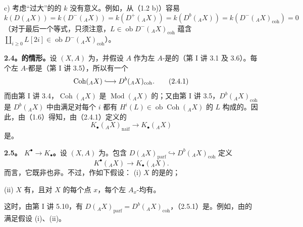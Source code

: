 c) 考虑“过大”的的 $k$ 没有意义。例如，从（1.2 b)）容易
\[k(D({}_AX))=k(D^-({}_AX))=k(D^+({}_AX))=k(D^b({}_AX))=k(D^-({}_AX)_{\mathrm{coh}})=0\]
（对于最后一个等式，只须注意，$L\in\operatorname{ob}D^-({}_AX)_{\mathrm{coh}}$ 蕴含 $\coprod_{i\geq0}L[2i]\in\operatorname{ob}D^-({}_AX)_{\mathrm{coh}}$）。

\textbf{2.4。的情形。}设 $(X,A)$ 为，并假设 $A$ 作为左 $A$-是的（第 I 讲 3.1 及 3.6）。每个左 $A$-都是（第 I 讲 3.5），所以有一个
\[\operatorname{Coh}({}_AX)\lhook\joinrel\longrightarrow D^b({}_AX)_{\mathrm{coh}}.\tag{2.4.1}\]
而由第 I 讲 3.4，$\operatorname{Coh}({}_AX)$ 是 $\operatorname{Mod}({}_AX)$ 的；又由第 I 讲 3.5，$D^b({}_AX)_{\mathrm{coh}}$ 是 $D^b({}_AX)$ 中由满足对每个 $i$ 都有 $H^i(L)\in\operatorname{ob}\operatorname{Coh}({}_AX)$ 的 $L$ 构成的。因此，由（1.6）得知，由（2.4.1）定义的
\[K_\bullet({}_AX)_{\text{naïf}}\longrightarrow K_\bullet({}_AX)\tag{2.4.2}\]
是。

\textbf{2.5。 $K^\bullet\to K_\bullet$。}设 $(X,A)$ 为。包含 $D({}_AX)_{\mathrm{parf}}\hookrightarrow D^b({}_AX)_{\mathrm{coh}}$ 定义
\[K^\bullet({}_AX)\longrightarrow K_\bullet({}_AX).\tag{2.5.1}\]
而言，它既非也非。不过，作如下假设：
(i) $X$ 的是的；

(ii) $X$ 有，且对 $X$ 的每个点 $x$，每个左 $A_x$-均有。

这时，由第 I 讲 5.10，有 $D({}_AX)_{\mathrm{parf}}=D^b({}_AX)_{\mathrm{coh}}$，（2.5.1）是。例如，由的满足假设 (i)、(ii)。

